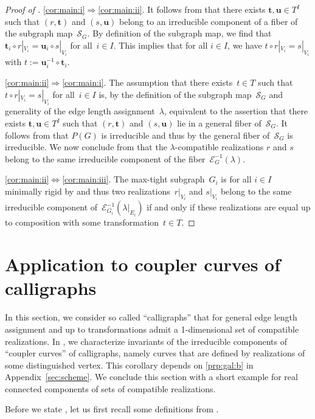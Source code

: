 \documentclass[12pt]{article}
\theoremstyle{definition}
\newcommand{\APP}[1]{Appendix~\ref{sec:#1}}
\newcommand{\RP}[2]{\Cref{prp:#1}\ref{prp:#1:#2}}
\newcommand{\st}{such that }
\newcommand{\cE}{\mathcal{E}}
\newcommand{\cS}{\mathcal{S}}
\newcommand{\bt}{\mathbf{t}}
\newcommand{\bu}{\mathbf{u}}
\begin{document}
\begin{proof}[Proof of ]
\ref{cor:main:i}$\Rightarrow$\ref{cor:main:ii}.
It follows from  that there exists $\bt,\bu\in T^I$
\st $(r,\bt)$ and $(s,\bu)$ belong to an irreducible component of
a fiber of the subgraph map~$\cS_G$.
By definition of the subgraph map, we find that
$\bt_i\circ r|_{V_i}=\bu_i\circ s|_{V_i}$ for all~$i\in I$.
This implies that for all $i\in I$, we have $t\circ r|_{V_i}=s|_{V_i}$
with $t:=\bu_i^{-1}\circ \bt_i$.

\ref{cor:main:ii}$\Rightarrow$\ref{cor:main:i}.
The assumption that there exists~$t\in T$ \st $t\circ r|_{V_i}=s|_{V_i}$ for all~$i\in I$ is,
by the definition of the subgraph map~$\cS_G$ and generality of the edge length assignment~$\lambda$,
equivalent to the assertion that there exists $\bt,\bu\in T^I$
\st $(r,\bt)$ and $(s,\bu)$ lie in a general fiber of~$\cS_G$.
It follows from  that $P(G)$ is irreducible and thus
by  the general fiber of~$\cS_G$ is irreducible.
We now conclude from  that the $\lambda$-compatible realizations
$r$ and $s$ belong to the same irreducible component of the fiber~$\cE_G^{-1}(\lambda)$.

\ref{cor:main:ii}$\Leftrightarrow$\ref{cor:main:iii}.
The max-tight subgraph~$G_i$ is for all $i\in I$
minimally rigid by  and thus two realizations~$r|_{V_i}$ and $s|_{V_i}$
belong to the same irreducible component of~$\cE_{G_i}^{-1}(\lambda|_{E_i})$
if and only if
these realizations are equal up to composition with some transformation~$t\in T$.
\end{proof}


\section{Application to coupler curves of calligraphs}
\label{sec:app}

In this section, we consider so called ``calligraphs''
that for general edge length assignment and  up to transformations
admit a 1-dimensional set of compatible realizations.
In , we characterize invariants of the irreducible components
of ``coupler curves'' of calligraphs, namely curves that are defined by realizations of some distinguished vertex.
This corollary depends on \RP{gal}{b} in \APP{scheme}.
We conclude this section with a short example
for real connected components of sets of compatible realizations.

Before we state , let us first recall some definitions from \cite{2023-cal}.
\end{document}
